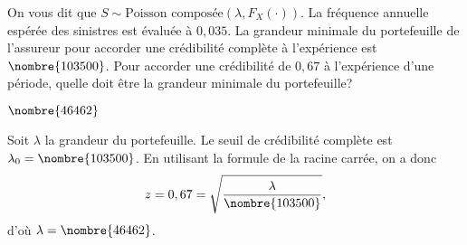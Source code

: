 \begin{exercice}
  On vous dit que $S \sim \text{Poisson composée}(\lambda,
  F_X(\cdot))$. La fréquence annuelle espérée des sinistres est
  évaluée à $0,035$. La grandeur minimale du portefeuille de
  l'assureur pour accorder une crédibilité complète à l'expérience est
  $\nombre{103500}$. Pour accorder une crédibilité de $0,67$ à
  l'expérience d'une période, quelle doit être la grandeur minimale du
  portefeuille?
  \begin{rep}
    $\nombre{46462}$
  \end{rep}
  \begin{sol}
    Soit $\lambda$ la grandeur du portefeuille. Le seuil de
    crédibilité complète est $\lambda_0 = \nombre{103500}$. En
    utilisant la formule de la racine carrée, on a donc
    \begin{equation*}
      z = 0,67 = \sqrt{\frac{\lambda}{\nombre{103500}}},
    \end{equation*}
    d'où $\lambda = \nombre{46462}$.
  \end{sol}
\end{exercice}

